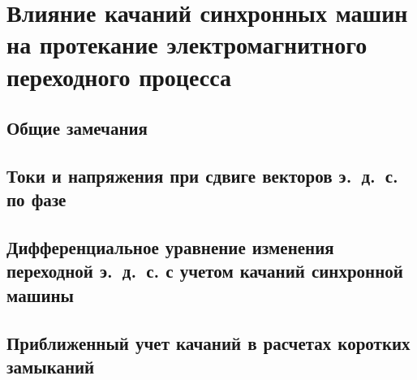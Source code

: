\chapter{Влияние качаний синхронных машин на протекание электромагнитного переходного процесса}
\label{chap:19}

\section{Общие замечания}
\label{sec:19-1}


\section{Токи и напряжения при сдвиге векторов э.~д.~с. по фазе}
\label{sec:19-2}


\section{Дифференциальное уравнение изменения переходной э.~д.~с. с учетом качаний синхронной машины}
\label{sec:19-3}


\section{Приближенный учет качаний в расчетах коротких замыканий}
\label{sec:19-4}